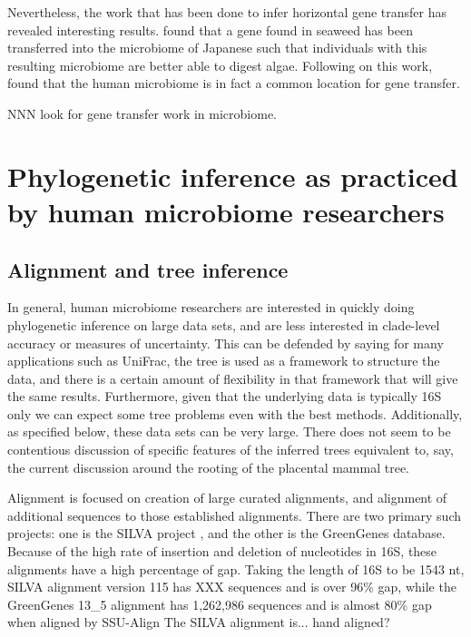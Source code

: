 \documentclass{amsart}
\begin{document}
Nevertheless, the work that has been done to infer horizontal gene transfer has revealed interesting results.
\citet{hehemann2010transfer} found that a gene found in seaweed has been transferred into the microbiome of Japanese such that individuals with this resulting microbiome are better able to digest algae.
Following on this work, \citet{smillie2011ecology} found that the human microbiome is in fact a common location for gene transfer.

NNN look for gene transfer work in microbiome.


\section{Phylogenetic inference as practiced by human microbiome researchers}

\subsection{Alignment and tree inference}
In general, human microbiome researchers are interested in quickly doing phylogenetic inference on large data sets, and are less interested in clade-level accuracy or measures of uncertainty.
This can be defended by saying for many applications such as UniFrac, the tree is used as a framework to structure the data, and there is a certain amount of flexibility in that framework that will give the same results.
Furthermore, given that the underlying data is typically 16S only we can expect some tree problems even with the best methods.
Additionally, as specified below, these data sets can be very large.
There does not seem to be contentious discussion of specific features of the inferred trees equivalent to, say, the current discussion around the rooting of the placental mammal tree.

Alignment is focused on creation of large curated alignments, and alignment of additional sequences to those established alignments.
There are two primary such projects: one is the SILVA project \citep{pruesse2007silva,quast2013silva}, and the other is the GreenGenes \citep{desantis2006greengenes,mcdonald2011improved} database.
Because of the high rate of insertion and deletion of nucleotides in 16S, these alignments have a high percentage of gap.
Taking the length of 16S to be 1543 nt,
SILVA alignment version 115 has XXX sequences and is over 96\% gap,
while the GreenGenes 13\_5 alignment has 1,262,986 sequences and  is almost 80\% gap when aligned by SSU-Align \cite{nawrocki2009structural}
The SILVA alignment is... hand aligned?
\end{document}
